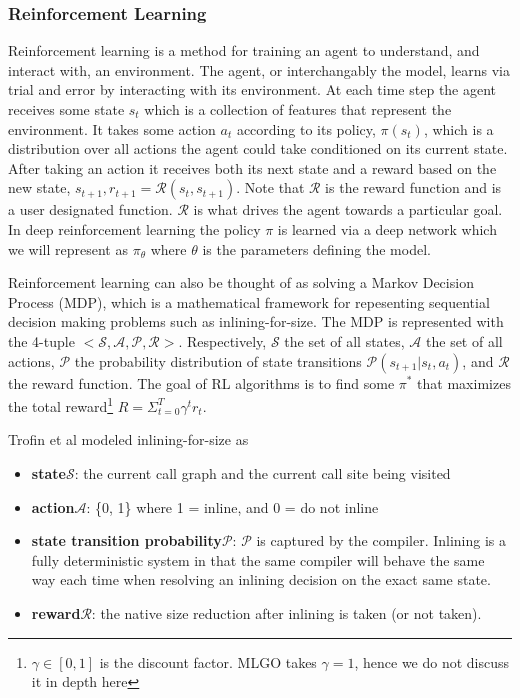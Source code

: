 \documentclass[nohyperref]{article}
\theoremstyle{plain}
\theoremstyle{definition}
\theoremstyle{remark}
\begin{document}
\subsubsection{Reinforcement Learning}
Reinforcement learning is a method for training an agent to understand, and interact with, an environment. The agent, or interchangably the model, learns via trial and error by interacting with its environment. At each time step the agent receives some state $s_t$ which is a collection of features that represent the environment. It takes some action $a_t$ according to its policy, $\pi(s_t)$, which is a distribution over all actions the agent could take conditioned on its current state. After taking an action it receives both its next state and a reward based on the new state, $s_{t+1}, r_{t+1} = \mathcal{R}(s_t, s_{t+1})$. Note that $\mathcal{R}$ is the reward function and is a user designated function. $\mathcal{R}$ is what drives the agent towards a particular goal. In deep reinforcement learning the policy $\pi$ is learned via a deep network which we will represent as $\pi_{\theta}$ where $\theta$ is the parameters defining the model.

Reinforcement learning can also be thought of as solving a Markov Decision Process (MDP), which is a mathematical framework for repesenting sequential decision making problems such as inlining-for-size. The MDP is represented with the 4-tuple $<\mathcal{S}, \mathcal{A}, \mathcal{P}, \mathcal{R}>$. Respectively, $\mathcal{S}$ the set of all states, $\mathcal{A}$ the set of all actions, $\mathcal{P}$ the probability distribution of state transitions $\mathcal{P}(s_{t+1}|s_t,a_t)$, and $\mathcal{R}$ the reward function. The goal of RL algorithms is to find some $\pi^*$ that maximizes the total reward\footnote{$\gamma \in [0, 1]$ is the discount factor. MLGO takes $\gamma = 1$, hence we do not discuss it in depth here} $R = \Sigma^{T}_{t=0}\gamma^t r_t$.

Trofin et al modeled inlining-for-size as
\begin{itemize}
\item\textbf{state}\;$\mathcal{S}$: the current call graph and the current call site being visited
\item\textbf{action}\;$\mathcal{A}$: \{0, 1\} where 1 = inline, and 0 = do not inline
\item\textbf{state transition probability}\;$\mathcal{P}$: $\mathcal{P}$ is captured by the compiler. Inlining is a fully deterministic system in that the same compiler will behave the same way each time when resolving an inlining decision on the exact same state.
\item\textbf{reward}\;$\mathcal{R}$: the native size reduction after inlining is taken (or not taken).
\end{itemize}
\end{document}
